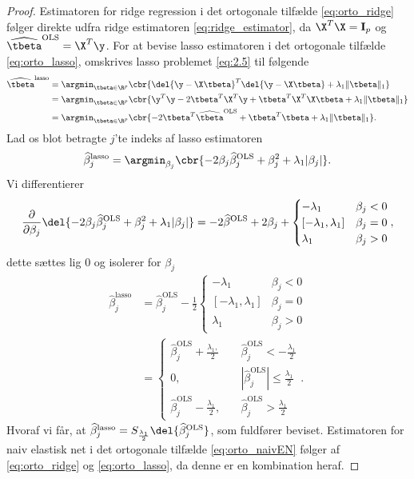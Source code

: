 \begin{proof}
Estimatoren for ridge regression i det ortogonale tilfælde \eqref{eq:orto_ridge} følger direkte udfra ridge estimatoren \eqref{eq:ridge_estimator}, da \(\X^T \X = \mathbf{I}_p\) og \(\widehat{\tbeta}^\text{OLS} = \X^T \y\).
For at bevise lasso estimatoren i det ortogonale tilfælde \eqref{eq:orto_lasso}, omskrives lasso problemet \eqref{eq:2.5} til følgende
\begin{align*}
\widehat{\tbeta}^\text{lasso} &= \argmin_{\tbeta \in \R^p} \cbr{\del{\y - \X \tbeta}^T \del{\y - \X \tbeta} + \lambda_1 \Vert \tbeta \Vert_1} \\
&= \argmin_{\tbeta \in \R^p} \cbr{ \y^T \y - 2 \tbeta^T \X^T \y + \tbeta^T \X^T \X \tbeta + \lambda_1 \Vert \tbeta \Vert_1} \\
&= \argmin_{\tbeta \in \R^p} \cbr{- 2 \tbeta^T \widehat{\tbeta}^\text{OLS} + \tbeta^T \tbeta + \lambda_1 \Vert \tbeta \Vert_1}.
\end{align*}
Lad os blot betragte \(j\)'te indeks af lasso estimatoren
\begin{align*}
\widehat{\beta}_j^\text{lasso} = \argmin_{\beta_j} \cbr{ - 2 \beta_j \widehat{\beta}_j^\text{OLS} + \beta_j^2 + \lambda_1 \vert \beta_j \vert}.
\end{align*}
Vi differentierer
\begin{align*}
\frac{\partial}{\partial \beta_j} \del{- 2 \beta_j \widehat{\beta}_j^\text{OLS} + \beta_j^2 + \lambda_1 \vert \beta_j \vert}
=-2\widehat{\beta}^\text{OLS} + 2\beta_j + \begin{cases}
-\lambda_1 \quad &\beta_j < 0 \\
[-\lambda_1, \lambda_1] & \beta_j = 0 \\
\lambda_1 & \beta_j >0 
\end{cases},
\end{align*}
dette sættes lig \(0\) og isolerer for \(\beta_j\)
\begin{align*}
\widehat{\beta}_j^\text{lasso} &= \widehat{\beta}_j^\text{OLS} - \frac{1}{2}\begin{cases}
-\lambda_1 \quad &\beta_j < 0 \\
[-\lambda_1, \lambda_1] & \beta_j = 0 \\
\lambda_1 & \beta_j >0 
\end{cases} \\
&= \begin{cases}
\widehat{\beta}_j^\text{OLS} + \frac{\lambda_1,}{2} \quad &\widehat{\beta}_j^\text{OLS} < - \frac{\lambda_1}{2} \\
0, &\left\vert\widehat{\beta}_j^\text{OLS} \right\vert \leq \frac{\lambda_1}{2} \\
\widehat{\beta}_j^\text{OLS} - \frac{\lambda_1}{2}, \quad &\widehat{\beta}_j^\text{OLS} > \frac{\lambda_1}{2}
\end{cases}. 
\end{align*}
Hvoraf vi får, at \(\widehat{\beta}_j^\text{lasso} = S_{\frac{\lambda_1}{2}} \del{ \widehat{\beta}_j^\text{OLS}} \), som fuldfører beviset.
Estimatoren for naiv elastisk net i det ortogonale tilfælde \eqref{eq:orto_naivEN} følger af \eqref{eq:orto_ridge} og \eqref{eq:orto_lasso}, da denne er en kombination heraf.
\end{proof}

